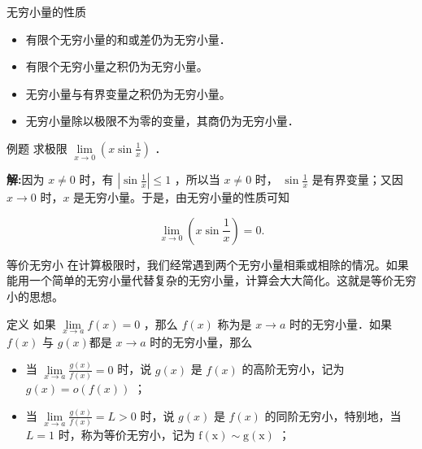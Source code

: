\documentclass[aspectratio=169,10pt]{ctexbeamer}
\begin{document}
\begin{frame}{无穷小量的性质}
	\small
	\begin{block}{ }
		\begin{itemize}
			\item 有限个无穷小量的和或差仍为无穷小量．
			\vspace{0.05cm}
		    \item  有限个无穷小量之积仍为无穷小量。
		    \vspace{0.05cm}
			\item  无穷小量与有界变量之积仍为无穷小量。
			\vspace{0.05cm}
			\item 无穷小量除以极限不为零的变量，其商仍为无穷小量．
		\end{itemize}
	\end{block}
	\normalsize
	\pause
	\begin{block}{例题}
		求极限 $\lim\limits _{x \rightarrow 0}\left(x \sin \frac{1}{x}\right)$ ．
		
	\end{block}
	
	\pause
	
	\textbf{解:}因为 $x \neq 0$ 时，有 $\left|\sin \frac{1}{x}\right| \leqslant 1$ ，所以当 $x \neq 0$ 时， $\sin \frac{1}{x}$ 是有界变量；又因$x \rightarrow 0$ 时，$x$ 是无穷小量。于是，由无穷小量的性质可知
	
	$$
	\lim\limits _{x \rightarrow 0}\left(x \sin \frac{1}{x}\right)=0 .
	$$
\end{frame}



\begin{frame}{等价无穷小}
	在计算极限时，我们经常遇到两个无穷小量相乘或相除的情况。如果能用一个简单的无穷小量代替复杂的无穷小量，计算会大大简化。这就是等价无穷小的思想。
	
	\vspace{0.5cm}
	
	\begin{block}{定义}
		如果 $\lim\limits _{x \rightarrow a} f(x)=0$ ，那么 $f(x)$ 称为是 $x \rightarrow a$ 时的无穷小量．如果 $f(x)$ 与 $g(x)$都是 $x \rightarrow a$ 时的无穷小量，那么
		\begin{itemize}
			\item[1．] 当 $\lim\limits _{x \rightarrow a} \frac{g(x)}{f(x)}=0$ 时，说 $g(x)$ 是 $f(x)$ 的高阶无穷小，记为 $g(x)=o(f(x))$ ；
			\item[2．] 当 $\lim\limits _{x \rightarrow a} \frac{g(x)}{f(x)}=L>0$ 时，说 $g(x)$ 是 $f(x)$ 的同阶无穷小，特别地，当 $L=1$ 时，称为等价无穷小，记为 $\mathrm{f}(\mathrm{x}) \sim \mathrm{g}(\mathrm{x})$ ；
		\end{itemize}
	\end{block}
\end{frame}
\end{document}
